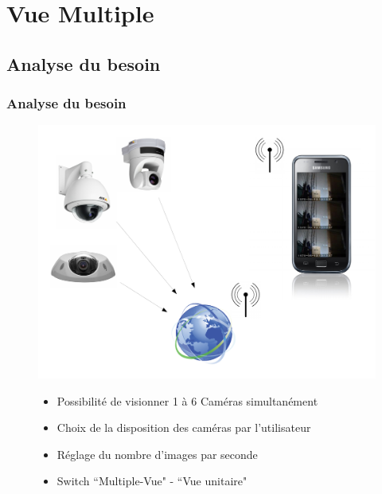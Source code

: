 
\section{Vue Multiple}
  \subsection{Analyse du besoin}
  \begin{frame}
   \frametitle{Analyse du besoin}


\begin{figure}[H]
  \centering
  \includegraphics[scale=0.25]{Images/ImageSlide9.pdf}
     \begin{itemize}
    \item Possibilité de visionner 1 à 6 Caméras simultanément
    \item Choix de la disposition des caméras par l'utilisateur
    \item Réglage du nombre d'images par seconde
    \item Switch ``Multiple-Vue" - ``Vue unitaire"
   \end{itemize}
  \end{figure}  

  \end{frame}
